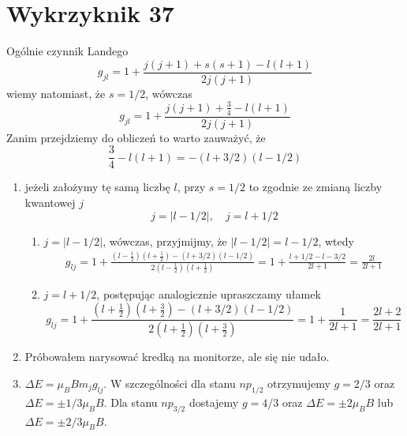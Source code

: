 \documentclass[a4paper,12pt]{article}
\begin{document}
\section{Wykrzyknik 37}
Ogólnie czynnik Landego
$$
g_{jl} = 1+\frac{j(j+1) +s(s+1)-l(l+1)}{2j(j+1)}
$$
wiemy natomiast, że $s=1/2$, wówczas
$$
g_{jl} = 1+\frac{j(j+1) +\frac{3}{4}-l(l+1)}{2j(j+1)}
$$
Zanim przejdziemy do obliczeń to warto zauważyć, że 
$$
\frac{3}{4}-l(l+1) = -(l+3/2)(l-1/2)
$$
\begin{enumerate}
	\item jeżeli założymy tę samą liczbę $l$, przy $s=1/2$ to zgodnie ze zmianą liczby kwantowej $j$
	$$
	j = |l-1/2|,\quad j=l+1/2
	$$

	\begin{enumerate}
		\item $ j = |l-1/2|$, wówczas, przyjmijmy, że $|l-1/2|=l-1/2$, wtedy
		$$
		\begin{gathered}
			g_{lj} = 1 + \frac{(l-\frac{1}{2})(l+\frac{1}{2})-(l+3/2)(l-1/2)}{2(l-\frac{1}{2})(l+\frac{1}{2})} = 1+\frac{l+1/2-l-3/2}{2l+1} = \frac{2l}{2l+1}
		\end{gathered}
		$$
		\item $j=l+1/2$, postępując analogicznie upraszczamy ułamek
		$$
		g_{lj} = 1 + \frac{(l+\frac{1}{2})(l+\frac{3}{2})-(l+3/2)(l-1/2)}{2(l+\frac{1}{2})(l+\frac{3}{2})} = 1+\frac{1}{2l+1} = \frac{2l+2}{2l+1}
		$$
	\end{enumerate}
\item Próbowałem narysować kredką na monitorze, ale się nie udało.
\item $\Delta E = \mu_B B m_j g_{lj}$. W szczególności dla stanu $np_{1/2}$ otrzymujemy $g = 2/3$ oraz $\Delta E = \pm 1/3 \mu_B B$. Dla stanu $np_{3/2}$ dostajemy $g = 4/3$ oraz $\Delta E = \pm 2\mu_B B$ lub $\Delta E = \pm 2/3 \mu_B B$.
\end{enumerate}
\end{document}
